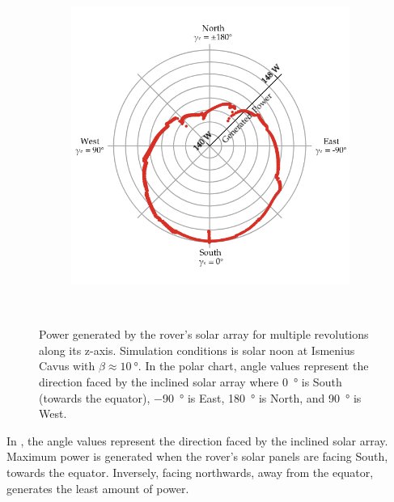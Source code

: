 \begin{figure}[h]
\begin{subfigure}[t]{\subfigureWidth}
        \includegraphics[height=\graphicsHeight]{sections/design/simulation/plots/zaxis-revolutions-polar.png}
		\label{fig:sub:simulation-data-rover-revolution-generated-power-polar-chart}
	\end{subfigure}\\[0.6ex]
    \caption[Power generated by the rover's solar array for multiple revolutions along its z-axis]
            {Power generated by the rover's solar array for multiple revolutions along its z-axis. Simulation conditions is solar noon at Ismenius Cavus with $\beta \approx \SI{10}{\degree}$. In the polar chart, angle values represent the direction faced by the inclined solar array where \SI{0}{\degree} is South (towards the equator), \SI{-90}{\degree} is East, \SI{180}{\degree} is North, and \SI{90}{\degree} is West.}
    \label{fig:simulation-data-rover-revolution-generated-power}
\vspace{-2ex}
\end{figure}


In , the angle values represent the direction faced by the inclined solar array. Maximum power is generated when the rover's solar panels are facing South, towards the equator. Inversely, facing northwards, away from the equator, generates the least amount of power.

